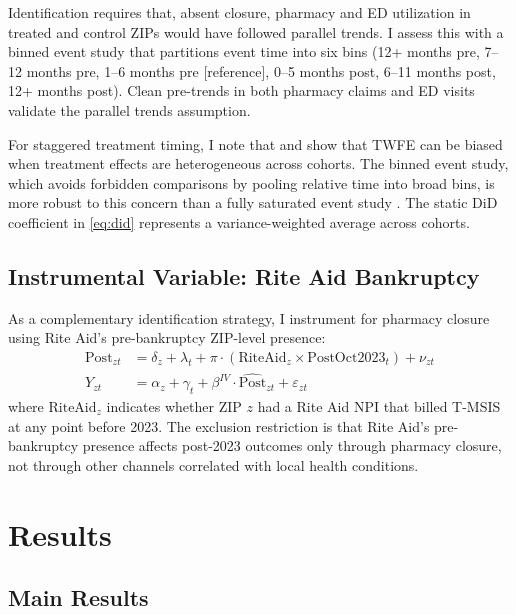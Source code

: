 \documentclass[12pt]{article}
\begin{document}
Identification requires that, absent closure, pharmacy and ED utilization in treated and control ZIPs would have followed parallel trends. I assess this with a binned event study that partitions event time into six bins (12+ months pre, 7--12 months pre, 1--6 months pre [reference], 0--5 months post, 6--11 months post, 12+ months post). Clean pre-trends in both pharmacy claims and ED visits validate the parallel trends assumption.

For staggered treatment timing, I note that \citet{goodmanbacon2021difference} and \citet{callaway2021difference} show that TWFE can be biased when treatment effects are heterogeneous across cohorts. The binned event study, which avoids forbidden comparisons by pooling relative time into broad bins, is more robust to this concern than a fully saturated event study \citep{sun2021estimating}. The static DiD coefficient in \eqref{eq:did} represents a variance-weighted average across cohorts.

\subsection{Instrumental Variable: Rite Aid Bankruptcy}

As a complementary identification strategy, I instrument for pharmacy closure using Rite Aid's pre-bankruptcy ZIP-level presence:
\begin{align}
\text{Post}_{zt} &= \delta_z + \lambda_t + \pi \cdot (\text{RiteAid}_z \times \text{PostOct2023}_t) + \nu_{zt} \label{eq:fs} \\
Y_{zt} &= \alpha_z + \gamma_t + \beta^{IV} \cdot \widehat{\text{Post}}_{zt} + \varepsilon_{zt} \label{eq:ss}
\end{align}
where $\text{RiteAid}_z$ indicates whether ZIP $z$ had a Rite Aid NPI that billed T-MSIS at any point before 2023. The exclusion restriction is that Rite Aid's pre-bankruptcy presence affects post-2023 outcomes only through pharmacy closure, not through other channels correlated with local health conditions.

\section{Results}

\subsection{Main Results}


\end{document}
